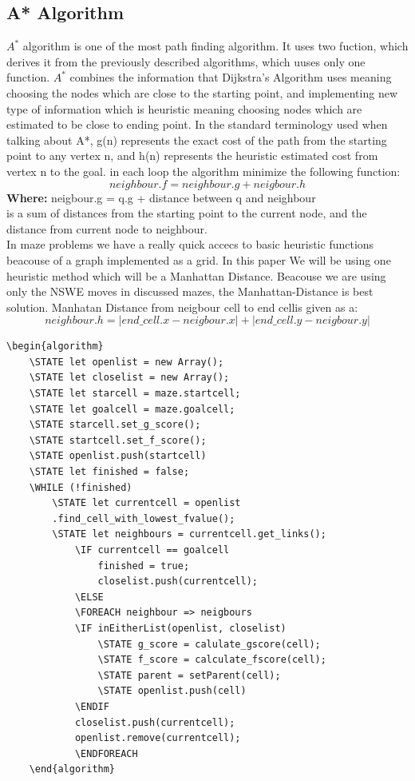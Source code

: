 \subsection{A* Algorithm}
$A^*$ algorithm is one of the most path finding algorithm. It uses two fuction, which derives it from the previously described algorithms, which uuses only one function. $A^*$ combines the information that Dijkstra’s Algorithm uses meaning choosing the nodes which are close to the starting point, and implementing new type of information which is heuristic meaning choosing nodes which are estimated to be close to ending point. In the standard terminology used when talking about A*, g(n) represents the exact cost of the path from the starting point to any vertex n, and h(n) represents the heuristic estimated cost from vertex n to the goal. in each loop the algorithm minimize the following function:
\begin{equation}
neighbour.f = neighbour.g + neigbour.h
\end{equation}
\textbf{Where:}
neigbour.g = q.g + distance between q and neighbour\\
is a sum of distances from the starting point to the current node, and the distance from current node to neighbour.	\\
\newline
In maze problems we have a really quick accecs to basic heuristic functions beacouse of a graph implemented as a grid. In this paper We will be using one heuristic method which will be a Manhattan Distance. Beacouse we are using only the NSWE moves in discussed mazes, the Manhattan-Distance is best solution.
Manhatan Distance from neigbour cell to end cellis given as a:
\begin{equation}
neighbour.h = |end\_cell.x - neigbour.x| + |end\_cell.y - neigbour.y|
\end{equation}
\begin{lstlisting}[caption={Pseudocode for a Dijkstra's algorithm}]
	\begin{algorithm}
	\STATE let openlist = new Array();
	\STATE let closelist = new Array();
	\STATE let starcell = maze.startcell;
	\STATE let goalcell = maze.goalcell;
	\STATE starcell.set_g_score();
	\STATE startcell.set_f_score();
	\STATE openlist.push(startcell)
	\STATE let finished = false;
	\WHILE (!finished)
		\STATE let currentcell = openlist    
		.find_cell_with_lowest_fvalue();
		\STATE let neighbours = currentcell.get_links();
			\IF currentcell == goalcell
				finished = true;
				closelist.push(currentcell);
			\ELSE 
			\FOREACH neighbour => neigbours	
			\IF inEitherList(openlist, closelist)
				\STATE g_score = calulate_gscore(cell);
				\STATE f_score = calculate_fscore(cell);
				\STATE parent = setParent(cell);
				\STATE openlist.push(cell)
			\ENDIF
			closelist.push(currentcell);
			openlist.remove(currentcell);
	    	\ENDFOREACH
	\end{algorithm}
	\end{lstlisting}



